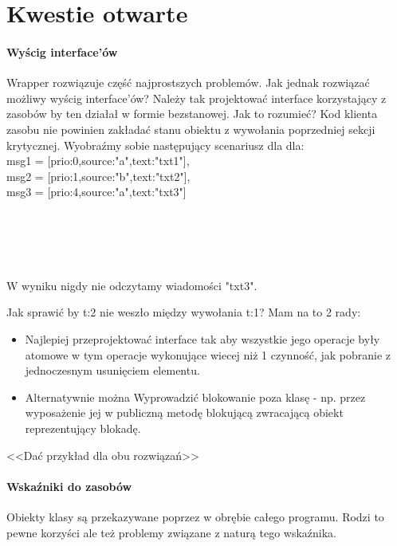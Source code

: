 \section{Kwestie otwarte}\label{sec:open-cases}

\paragraph{Wyścig interface'ów}\label{par:interface-race}
Wrapper  rozwiązuje część najprostszych problemów. Jak jednak rozwiązać możliwy wyścig interface'ów?
Należy tak projektować interface korzystający z zasobów by ten działał w formie bezstanowej. Jak to rozumieć?
Kod klienta zasobu nie powinien zakładać stanu obiektu z wywołania poprzedniej sekcji krytycznej. Wyobraźmy sobie następujący scenariusz dla  dla:
\\msg1 = [prio:0,source:"a",text:"txt1"],
\\msg2 = [prio:1,source:"b",text:"txt2"],
\\msg3 = [prio:4,source:"a",text:"txt3"]
\\
\\
\\
\\
\\
\\W wyniku nigdy nie odczytamy wiadomości "txt3".

Jak sprawić by t:2 nie weszło między wywołania t:1? Mam na to 2 rady:
\begin{itemize}
\item Najlepiej przeprojektować interface tak aby wszystkie jego operacje były atomowe w tym operacje wykonujące wiecej niż 1 czynność, jak pobranie z jednoczesnym usunięciem elementu.
\item Alternatywnie można Wyprowadzić blokowanie poza klasę  - np. przez wyposażenie jej w publiczną metodę blokującą zwracającą obiekt reprezentujący blokadę.
\end{itemize}

<<Dać przykład dla obu rozwiązań>>

\paragraph{Wskaźniki do zasobów}
Obiekty klasy  są przekazywane poprzez  w obrębie całego programu. Rodzi to pewne korzyści ale też problemy związane z naturą tego wskaźnika.

